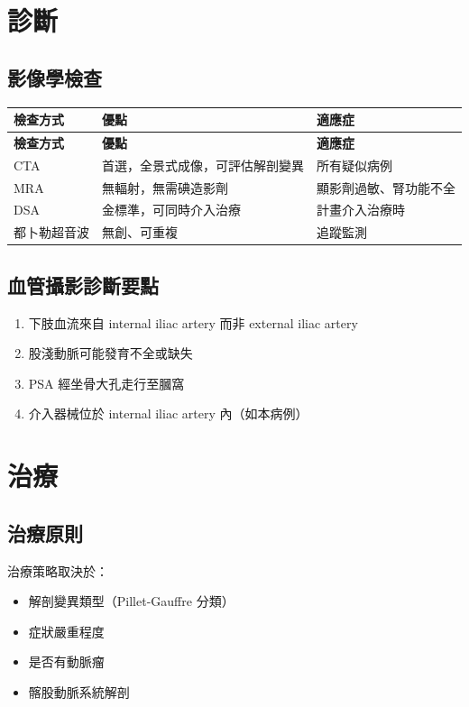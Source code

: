 \documentclass[12pt,a4paper]{article}
\begin{document}
\section{診斷}

\subsection{影像學檢查}

\begin{longtable}{p{4cm}p{5cm}p{5cm}}
\toprule
\textbf{檢查方式} & \textbf{優點} & \textbf{適應症} \\
\midrule
\endfirsthead
\toprule
\textbf{檢查方式} & \textbf{優點} & \textbf{適應症} \\
\midrule
\endhead
\bottomrule
\endlastfoot
CTA & 首選，全景式成像，可評估解剖變異 & 所有疑似病例 \\
\midrule
MRA & 無輻射，無需碘造影劑 & 顯影劑過敏、腎功能不全 \\
\midrule
DSA & 金標準，可同時介入治療 & 計畫介入治療時 \\
\midrule
都卜勒超音波 & 無創、可重複 & 追蹤監測 \\
\end{longtable}

\subsection{血管攝影診斷要點}

\begin{enumerate}
    \item 下肢血流來自 internal iliac artery 而非 external iliac artery
    \item 股淺動脈可能發育不全或缺失
    \item PSA 經坐骨大孔走行至膕窩
    \item 介入器械位於 internal iliac artery 內（如本病例）
\end{enumerate}

\section{治療}

\subsection{治療原則}

治療策略取決於：
\begin{itemize}
    \item 解剖變異類型（Pillet-Gauffre 分類）
    \item 症狀嚴重程度
    \item 是否有動脈瘤
    \item 髂股動脈系統解剖
\end{itemize}
\end{document}
